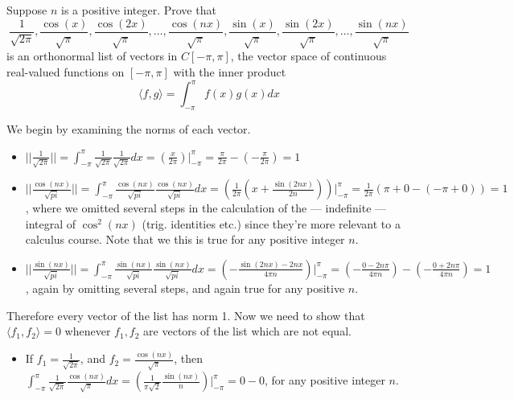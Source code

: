 \begin{exercise}{4}
    Suppose $n$ is a positive integer. Prove that
    $$\frac{1}{\sqrt{2\pi}}, \frac{\cos(x)}{\sqrt{\pi}}, \frac{\cos(2x)}{\sqrt{\pi}}, \ldots, \frac{\cos(nx)}{\sqrt{\pi}}, \frac{\sin(x)}{\sqrt{\pi}}, \frac{\sin(2x)}{\sqrt{\pi}}, \ldots, \frac{\sin(nx)}{\sqrt{\pi}}$$
    is an orthonormal list of vectors in $C[-\pi, \pi]$, the vector space of continuous real-valued functions on $[-\pi, \pi]$ with the inner product
    $$ \langle f, g \rangle = \int_{-\pi}^{\pi} f(x)g(x) dx$$
\end{exercise}

\begin{solution}

    We begin by examining the norms of each vector.
    \begin{itemize}
        \item $\lvert \lvert \frac{1}{\sqrt{2\pi}} \rvert \rvert= \int_{-\pi}^{\pi} \frac{1}{\sqrt{2\pi}} \frac{1}{\sqrt{2\pi}} dx = \left(\frac{x}{2\pi}\right)\Big|_{-\pi}^{\pi} = \frac{\pi}{2\pi} - (-\frac{\pi}{2\pi}) = 1$
        \item $\lvert \lvert \frac{\cos(nx)}{\sqrt{pi}} \rvert \rvert = \int_{-\pi}^{\pi} \frac{\cos(nx)}{\sqrt{pi}} \frac{\cos(nx)}{\sqrt{pi}} dx = \left(\frac{1}{2\pi}(x + \frac{\sin(2nx)}{2n})\right)\Big|_{-\pi}^{\pi} = \frac{1}{2\pi}(\pi + 0 - (-\pi + 0)) = 1$, where we omitted several steps in the calculation of the --- indefinite ---integral of $\cos^2(nx)$ (trig. identities etc.) since they're more relevant to a calculus course. Note that we this is true for any positive integer $n$.
        \item $\lvert \lvert \frac{\sin(nx)}{\sqrt{pi}} \rvert \rvert = \int_{-\pi}^{\pi} \frac{\sin(nx)}{\sqrt{pi}} \frac{\sin(nx)}{\sqrt{pi}} dx = \left(-\frac{\sin(2nx) - 2nx}{4\pi n}\right)\Big|_{-\pi}^{\pi} = (-\frac{0 - 2n\pi}{4\pi n}) - (-\frac{0 + 2n\pi}{4\pi n}) = 1$, again by omitting several steps, and again true for any positive $n$.
    \end{itemize}
    Therefore every vector of the list has norm 1. Now we need to show that $\langle f_1, f_2 \rangle = 0$ whenever $f_1, f_2$ are vectors of the list which are not equal.
    \begin{itemize}
        \item If $f_1 = \frac{1}{\sqrt{2\pi}}$, and $f_2 = \frac{\cos(nx)}{\sqrt{\pi}}$, then $\int_{-\pi}^{\pi} \frac{1}{\sqrt{2\pi}}\frac{\cos(nx)}{\sqrt{\pi}} dx = \left(\frac{1}{\pi\sqrt{2}} \frac{\sin(nx)}{n}\right)\Big|_{-\pi}^{\pi} = 0 - 0$, for any positive integer $n$.

\end{itemize}
\end{solution}
